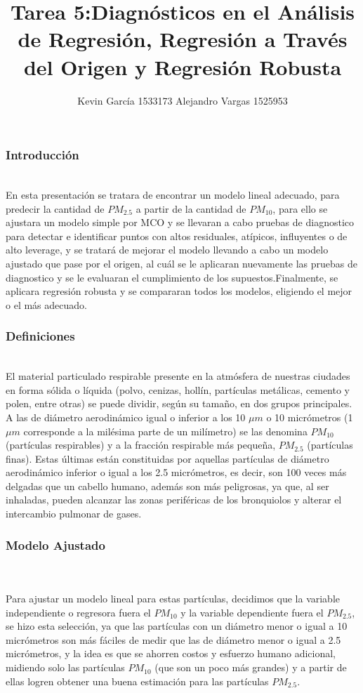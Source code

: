 \documentclass[12pt]{beamer}
\author[Kevin García - Alejandro Vargas]{Kevin García 1533173 \newline Alejandro Vargas 1525953}
\title[Tarea 5: Regresión Robusta]{Tarea 5:Diagnósticos en el Análisis de Regresión, Regresión a Través del Origen y Regresión Robusta}
\begin{document}
\justify
\begin{frame}
\titlepage
\end{frame}

\begin{frame}
\frametitle{Introducción}
~\\En esta presentación se tratara de encontrar un modelo lineal adecuado, para predecir la cantidad de $PM_{2.5}$ a partir de la cantidad de $PM_{10}$, para ello se ajustara un modelo simple por MCO y se llevaran a cabo pruebas de diagnostico para detectar e identificar puntos con altos residuales, atípicos, influyentes o de alto leverage, y se tratará de mejorar el modelo llevando a cabo un modelo ajustado que pase por el origen, al cuál se le aplicaran nuevamente las pruebas de diagnostico y se le evaluaran el cumplimiento de los supuestos.Finalmente, se aplicara regresión robusta y se compararan todos los modelos, eligiendo el mejor o el más adecuado.
\end{frame}

\begin{frame}
\frametitle{Definiciones}
~\\El material particulado respirable presente en la atmósfera de nuestras ciudades en forma sólida o líquida (polvo, cenizas, hollín, partículas metálicas, cemento y polen, entre otras) se puede dividir, según su tamaño, en dos grupos principales. A las de diámetro aerodinámico igual o inferior a los 10 $\mu m$ o 10 micrómetros (1 $\mu m$ corresponde a la milésima parte de un milímetro) se las denomina $PM_{10}$ (partículas respirables) y a la fracción respirable más pequeña, $PM_{2.5}$ (partículas finas). Estas últimas están constituidas por aquellas partículas de diámetro aerodinámico inferior o igual a los 2.5 micrómetros, es decir, son 100 veces más delgadas que un cabello humano, además son más peligrosas, ya que, al ser inhaladas, pueden alcanzar las zonas periféricas de los bronquiolos y alterar el intercambio pulmonar de gases.
\end{frame}

\begin{frame}
\frametitle{Modelo Ajustado}
~\\~\\Para ajustar un modelo lineal para estas partículas, decidimos que la variable independiente o regresora fuera el $PM_{10}$ y la variable dependiente fuera el $PM_{2.5}$, se hizo esta selección, ya que las partículas con un diámetro menor o igual a 10 micrómetros son más fáciles de medir que las de diámetro menor o igual a 2.5 micrómetros, y la idea es que se ahorren costos y esfuerzo humano adicional, midiendo solo las partículas $PM_{10}$ (que son un poco más grandes) y a partir de ellas logren obtener una buena estimación para las partículas $PM_{2.5}$.
\end{frame}
\end{document}
